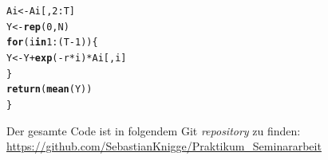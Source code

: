 \documentclass[10pt,a4paper]{report}\usepackage[]{graphicx}\usepackage[]{color}
\makeatletter
\newcommand{\hlnum}[1]{\textcolor[rgb]{0.686,0.059,0.569}{#1}}%
\newcommand{\hlopt}[1]{\textcolor[rgb]{0,0,0}{#1}}%
\newcommand{\hlstd}[1]{\textcolor[rgb]{0.345,0.345,0.345}{#1}}%
\newcommand{\hlkwa}[1]{\textcolor[rgb]{0.161,0.373,0.58}{\textbf{#1}}}%
\newcommand{\hlkwb}[1]{\textcolor[rgb]{0.69,0.353,0.396}{#1}}%
\newcommand{\hlkwd}[1]{\textcolor[rgb]{0.737,0.353,0.396}{\textbf{#1}}}%
\newenvironment{kframe}{%
 \def\at@end@of@kframe{}%
 \ifinner\ifhmode%
  \def\at@end@of@kframe{\end{minipage}}%
  \begin{minipage}{\columnwidth}%
 \fi\fi%
 \def\FrameCommand##1{\hskip\@totalleftmargin \hskip-\fboxsep
 \colorbox{shadecolor}{##1}\hskip-\fboxsep
     \hskip-\linewidth \hskip-\@totalleftmargin \hskip\columnwidth}%
 \MakeFramed {\advance\hsize-\width
   \@totalleftmargin\z@ \linewidth\hsize
   \@setminipage}}%
 {\par\unskip\endMakeFramed%
 \at@end@of@kframe}
\makeatother
\begin{document}
\begin{kframe}
\begin{alltt}
  \hlstd{Ai} \hlkwb{<-} \hlstd{Ai[,}\hlnum{2}\hlopt{:}\hlstd{T]}
  \hlstd{Y} \hlkwb{<-} \hlkwd{rep}\hlstd{(}\hlnum{0}\hlstd{,N)}
  \hlkwa{for} \hlstd{(i} \hlkwa{in} \hlnum{1}\hlopt{:}\hlstd{(T}\hlopt{-}\hlnum{1}\hlstd{))\{}
    \hlstd{Y} \hlkwb{<-} \hlstd{Y}\hlopt{+}\hlkwd{exp}\hlstd{(}\hlopt{-}\hlstd{r}\hlopt{*}\hlstd{i)}\hlopt{*}\hlstd{Ai[,i]}
  \hlstd{\}}
  \hlkwd{return}\hlstd{(}\hlkwd{mean}\hlstd{(Y))}
\hlstd{\}}
\end{alltt}
\end{kframe}


Der gesamte Code ist in folgendem Git \textit{repository} zu finden:
\url{https://github.com/SebastianKnigge/Praktikum_Seminararbeit}
\end{document}
